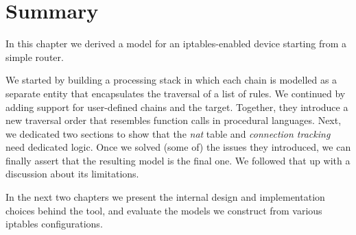 \section{Summary}
In this chapter we derived a model for an iptables-enabled device starting from
a simple router.

We started by building a processing stack in which each chain is modelled as a
separate entity that encapsulates the traversal of a list of rules.  We
continued by adding support for user-defined chains and the \RETURN target.
Together, they introduce a new traversal order that resembles function calls in
procedural languages.  Next, we dedicated two sections to show that the
\emph{nat} table and \emph{connection tracking} need dedicated logic.  Once we
solved (some of) the issues they introduced, we can finally assert that the
resulting model is the final one.  We followed that up with a discussion about
its limitations.

In the next two chapters we present the internal design and implementation
choices behind the \TOOL tool, and evaluate the models we construct from
various iptables configurations.
